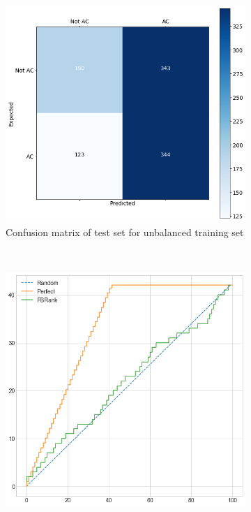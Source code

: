\begin{figure}[H]
	\begin{subfigure}{\textwidth}
		\centering
		\includegraphics[scale=0.3]{./src/fbRank/fbrank_nob_cm.png}
		\caption{Confusion matrix of test set for unbalanced training set}\label{}
	\end{subfigure}\\
	\begin{subfigure}{.5\textwidth}
		\centering
		\includegraphics[scale=0.3]{./src/fbRank/fbrank_cumulative_graph_top100.png}

\end{subfigure}
\end{figure}
